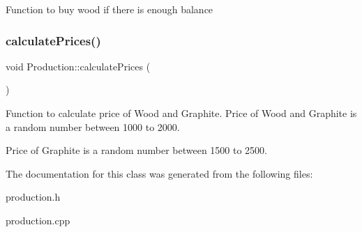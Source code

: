 Function to buy wood if there is enough balance \mbox{\label{classProduction_a4a9bbd94b71b1d24d836d9ad79bed97b}} 
\subsubsection{\texorpdfstring{calculate\+Prices()}{calculatePrices()}}
{\footnotesize\ttfamily void Production\+::calculate\+Prices (\begin{DoxyParamCaption}{ }\end{DoxyParamCaption})}

Function to calculate price of Wood and Graphite. Price of Wood and Graphite is a random number between 1000 to 2000.

Price of Graphite is a random number between 1500 to 2500. 

The documentation for this class was generated from the following files\+:\begin{DoxyCompactItemize}
\item 
production.\+h\item 
production.\+cpp\end{DoxyCompactItemize}
